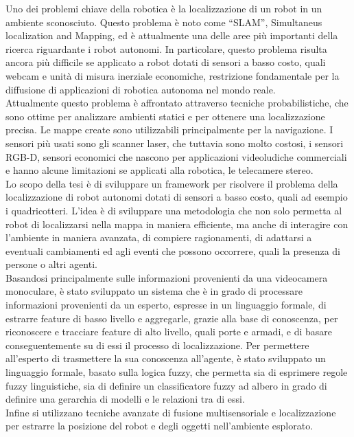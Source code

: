 Uno dei problemi chiave della robotica è la localizzazione di un robot in un ambiente sconosciuto. Questo problema è noto come ``SLAM'', Simultaneus localization and Mapping, ed è attualmente una delle aree più importanti della ricerca riguardante i robot autonomi. 
In particolare, questo problema risulta ancora più difficile se applicato a robot dotati di sensori a basso costo, quali webcam e unità di misura inerziale economiche, restrizione fondamentale per la diffusione di applicazioni di robotica autonoma nel mondo reale. \\
Attualmente questo problema è affrontato attraverso tecniche probabilistiche, che sono ottime per analizzare ambienti statici e per ottenere una localizzazione precisa. Le mappe create sono utilizzabili principalmente per la navigazione.
I sensori più usati sono gli scanner laser, che tuttavia sono molto costosi, i sensori RGB-D, sensori economici che nascono per applicazioni videoludiche commerciali e hanno alcune limitazioni se applicati alla robotica, le telecamere stereo. \\
Lo scopo della tesi è di sviluppare un framework per risolvere il problema della localizzazione di robot autonomi dotati di sensori a basso costo, quali ad esempio i quadricotteri. L'idea è di sviluppare una metodologia che non solo permetta al robot di localizzarsi nella mappa in maniera efficiente, ma anche di interagire con l'ambiente in maniera avanzata, di compiere ragionamenti, di adattarsi a eventuali cambiamenti ed agli eventi che possono occorrere, quali la presenza di persone o altri agenti. \\
Basandosi principalmente sulle informazioni provenienti da una videocamera monoculare, è stato sviluppato un sistema che è in grado di processare informazioni provenienti da un esperto, espresse in un linguaggio formale, di estrarre feature di basso livello e aggregarle, grazie alla base di conoscenza, per riconoscere e tracciare feature di alto livello, quali porte e armadi, e di basare conseguentemente su di essi il processo di localizzazione.
Per permettere all'esperto di trasmettere la sua conoscenza all'agente, è stato sviluppato un linguaggio formale, basato sulla logica fuzzy, che permetta sia di esprimere regole fuzzy linguistiche, sia di definire un classificatore fuzzy ad albero in grado di definire una gerarchia di modelli e le relazioni tra di essi. \\
Infine si utilizzano tecniche avanzate di fusione multisensoriale e localizzazione per estrarre la posizione del robot e degli oggetti nell'ambiente esplorato.

